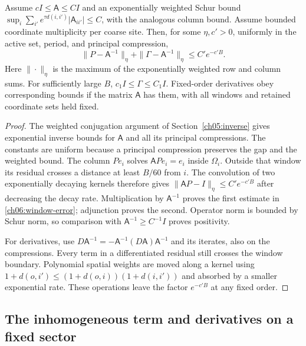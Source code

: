 \begin{proposition}
\label{ch06:windows}
Assume $cI\le\mathsf A\le CI$ and an exponentially weighted Schur bound
$\sup_i\sum_{i'}e^{\tau d(i,i')}|\mathsf A_{ii'}|\le C$, with the analogous
column bound. Assume bounded coordinate multiplicity per coarse site.
Then, for some $\eta,c'>0$, uniformly in the active set, period, and
principal compression,
\begin{equation}
 \|P-\mathsf A^{-1}\|_\eta+
 \|\Gamma-\mathsf A^{-1}\|_\eta\le C'e^{-c'B}.
 \label{ch06:window-error}
\end{equation}
Here $\|\cdot\|_\eta$ is the maximum of the exponentially weighted row and
column sums. For sufficiently large $B$, $c_1I\le\Gamma\le C_1I$.
Fixed-order derivatives obey corresponding bounds if the matrix $\mathsf A$
has them, with all windows and retained coordinate sets held fixed.
\end{proposition}
\begin{proof}
The weighted conjugation argument of Section~\ref{ch05:inverse} gives
exponential inverse bounds for $\mathsf A$ and all its principal
compressions. The constants are uniform because a principal compression
preserves the gap and the weighted bound. The column $Pe_i$ solves
$\mathsf APe_i=e_i$ inside $\Omega_i$. Outside that window its residual
crosses a distance at least $B/60$ from $i$. The convolution of two
exponentially decaying kernels therefore gives
$\|\mathsf AP-I\|_\eta\le C'e^{-c'B}$ after decreasing the decay rate.
Multiplication by $\mathsf A^{-1}$ proves the first estimate in
\eqref{ch06:window-error}; adjunction proves the second. Operator norm
is bounded by Schur norm, so comparison with $\mathsf A^{-1}\ge C^{-1}I$
proves positivity.

For derivatives, use $D\mathsf A^{-1}=-\mathsf A^{-1}(D\mathsf A)
\mathsf A^{-1}$ and its iterates, also on the compressions. Every term in
a differentiated residual still crosses the window boundary. Polynomial
spatial weights are moved along a kernel using
$1+d(o,i')\le(1+d(o,i))(1+d(i,i'))$ and absorbed by a smaller exponential
rate. These operations leave the factor $e^{-c'B}$ at any fixed order.
\end{proof}

\subsection{The inhomogeneous term and derivatives on a fixed sector}

